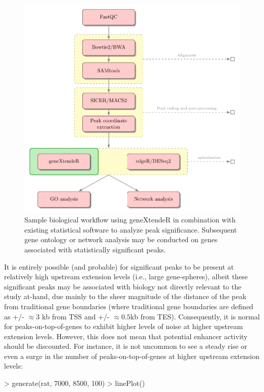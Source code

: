 \documentclass[12pt]{article}
\begin{document}
\begin{figure}[H]
\centering
\includegraphics{figures/workflow.pdf}
\caption{Sample biological workflow using geneXtendeR in combination with existing statistical software to analyze peak significance.  Subsequent gene ontology or network analysis may be conducted on genes associated with statistically significant peaks.}
\end{figure}

It is entirely possible (and probable) for significant peaks to be present at relatively high upstream extension levels (i.e., large gene-spheres), albeit these significant peaks may be associated with biology not directly relevant to the study at-hand, due mainly to the sheer magnitude of the distance of the peak from traditional gene boundaries (where traditional gene boundaries are defined as +/- $\approx 3$ kb from TSS and +/- $\approx 0.5$kb from TES).  Consequently, it is normal for peaks-on-top-of-genes to exhibit higher levels of noise at higher upstream extension levels.  However, this does not mean that potential enhancer activity should be discounted.  For instance, it is not uncommon to see a steady rise or even a surge in the number of peaks-on-top-of-genes at higher upstream extension levels:

\begin{Schunk}
\begin{Sinput}
> generate(rat, 7000, 8500, 100)
> linePlot()
\end{Sinput}
\end{Schunk}
\end{document}
